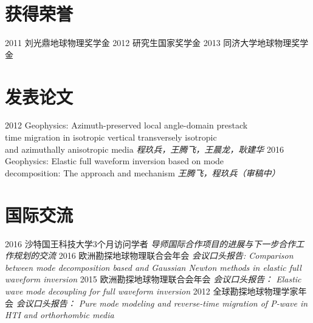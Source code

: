 \documentclass[]{friggeri-cv}
\begin{document}
\section{获得荣誉}
\begin{entrylist}
  \entryTwo
    {2011}
    {刘光鼎地球物理奖学金}
  \entryTwo
    {2012}
	{研究生国家奖学金}
  \entryTwo
    {2013}
    {同济大学地球物理奖学金}
\par\vspace{\parskip}
\end{entrylist}

\section{发表论文}
\begin{entrylist}
  \entry
    {2012}
	{Geophysics: Azimuth-preserved local angle-domain prestack \\
	time migration in isotropic	vertical transversely isotropic\\
	and azimuthally anisotropic media}
	{\emph{程玖兵，王腾飞，王晨龙，耿建华}}
  \entry
    {2016}
	{Geophysics: Elastic full waveform inversion based on mode\\
		decomposition: The approach and	mechanism
	}
	{\emph{王腾飞，程玖兵（审稿中）}}
\end{entrylist}

\section{国际交流}
\begin{entrylist}
  \entry
    {2016}
    {沙特国王科技大学3个月访问学者}
	{\emph{
		导师国际合作项目的进展与下一步合作工作规划的交流
	}}
  \entry
    {2016}
    {欧洲勘探地球物理联合会年会}
	{\emph{会议口头报告: Comparison between mode decomposition based and Gaussian Newton methods in
		elastic full waveform inversion
	}}
  \entry
    {2015}
    {欧洲勘探地球物理联合会年会}
	{\emph{会议口头报告： 
		Elastic wave mode decoupling for full waveform inversion
	}}
  \entry
    {2012}
    {全球勘探地球物理学家年会}
	{\emph{会议口头报告： Pure mode modeling and reverse-time migration of P-wave in
		HTI and orthorhombic media
	}}
\end{entrylist}
\end{document}

